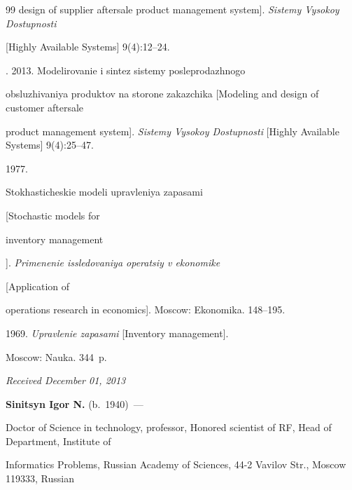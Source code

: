 {{\begin{thebibliography}{99}
design of supplier aftersale product management system]. \textit{Sistemy Vysokoy Dostupnosti}

[{Highly Available Systems}] 9(4):12--24.


. 2013. Modelirovanie i sintez sistemy posleprodazhnogo

obsluzhivaniya produktov na storone zakazchika [Modeling and design of customer aftersale

product management system]. \textit{Sistemy Vysokoy Dostupnosti} [{Highly Available Systems}] 9(4):25--47.


 1977. {Stokhasticheskie modeli upravleniya zapasami

[Stochastic models for

inventory management}]. \textit{Primenenie issledovaniya operatsiy v ekonomike}

[Application of

operations research in economics]. Moscow: Ekonomika. 148--195.


 1969. \textit{Upravlenie zapasami} [{Inventory management}].

Moscow: Nauka. 344~p.





 \end{thebibliography}

} }



\vspace*{-6pt}



\hfill{\small\textit{Received December 01, 2013}}



\vspace*{-6pt}





\Contr



\noindent

\textbf{Sinitsyn Igor N.} (b.\ 1940)~---

Doctor of Science in technology, professor, Honored scientist of RF, Head of Department, Institute of

Informatics Problems, Russian Academy of Sciences, 44-2 Vavilov Str., Moscow 119333, Russian

